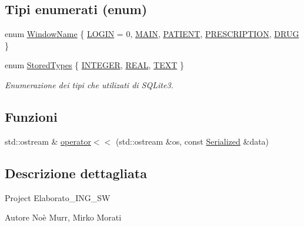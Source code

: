 \subsection*{Tipi enumerati (enum)}
\begin{DoxyCompactItemize}
\item 
enum \mbox{\hyperlink{namespacemm_a4e9d92e04f65dbf2fc1963947da0d93c}{Window\+Name}} \{ \newline
\mbox{\hyperlink{namespacemm_a4e9d92e04f65dbf2fc1963947da0d93ca625866ddfe14a6b663c4b95ee85c96f3}{L\+O\+G\+IN}} = 0, 
\mbox{\hyperlink{namespacemm_a4e9d92e04f65dbf2fc1963947da0d93cafd935ea5cffd64386f1549c51642164e}{M\+A\+IN}}, 
\mbox{\hyperlink{namespacemm_a4e9d92e04f65dbf2fc1963947da0d93cadde39aa33fd198a60d8046fbdf5e631f}{P\+A\+T\+I\+E\+NT}}, 
\mbox{\hyperlink{namespacemm_a4e9d92e04f65dbf2fc1963947da0d93ca59fb5a42d012d17664b7e9e30b54928b}{P\+R\+E\+S\+C\+R\+I\+P\+T\+I\+ON}}, 
\newline
\mbox{\hyperlink{namespacemm_a4e9d92e04f65dbf2fc1963947da0d93ca72cf6d0691540154498bec70aa8556f6}{D\+R\+UG}}
 \}
\item 
enum \mbox{\hyperlink{namespacemm_ad5a796af6d7145f51e84a73ed35a601c}{Stored\+Types}} \{ \mbox{\hyperlink{namespacemm_ad5a796af6d7145f51e84a73ed35a601ca119c99336926ef6e9520a5bbf9518a9a}{I\+N\+T\+E\+G\+ER}}, 
\mbox{\hyperlink{namespacemm_ad5a796af6d7145f51e84a73ed35a601caac9e9001649c4d59b7b51aabfb92f331}{R\+E\+AL}}, 
\mbox{\hyperlink{namespacemm_ad5a796af6d7145f51e84a73ed35a601ca7c167dd1f2b3ccf8ed3938f0c4838ef5}{T\+E\+XT}}
 \}
\begin{DoxyCompactList}\small\item\em Enumerazione dei tipi che utilizati di S\+Q\+Lite3. \end{DoxyCompactList}\end{DoxyCompactItemize}
\subsection*{Funzioni}
\begin{DoxyCompactItemize}
\item 
std\+::ostream \& \mbox{\hyperlink{namespacemm_a7ab9a5d20c82db4778995f35e6aa6abb}{operator$<$$<$}} (std\+::ostream \&os, const \mbox{\hyperlink{structmm_1_1_serialized}{Serialized}} \&data)
\end{DoxyCompactItemize}


\subsection{Descrizione dettagliata}
Project Elaborato\+\_\+\+I\+N\+G\+\_\+\+SW \begin{DoxyAuthor}{Autore}
Noè Murr, Mirko Morati 
\end{DoxyAuthor}


